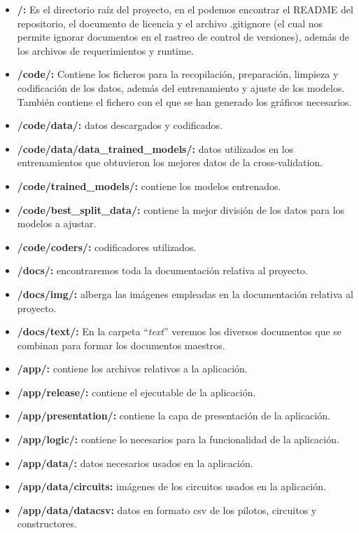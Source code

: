 \begin{itemize}
    \item \textbf{/:} Es el directorio raíz del proyecto, en el podemos encontrar el README del repositorio, el documento de licencia y el archivo .gitignore (el cual nos permite ignorar documentos en el rastreo de control de versiones), además de los archivos de requerimientos y runtime.
    \item \textbf{/code/:} Contiene los ficheros para la recopilación, preparación, limpieza y codificación de los datos, además del entrenamiento  y ajuste de los modelos. También contiene el fichero con el que se han generado los gráficos necesarios.
    \item \textbf{/code/data/:} datos descargados y codificados.
    \item \textbf{/code/data/data\_trained\_models/:} datos utilizados en los entrenamientos que obtuvieron los mejores datos de la cross-validation.
    \item \textbf{/code/trained\_models/:} contiene los modelos entrenados.
    \item \textbf{/code/best\_split\_data/:} contiene la mejor división de los datos para los modelos a ajustar.
    \item \textbf{/code/coders/:} codificadores utilizados.
    \item \textbf{/docs/:} encontraremos toda la documentación relativa al proyecto.
    \item \textbf{/docs/img/:} alberga las imágenes empleadas en la documentación relativa al proyecto.
    \item \textbf{/docs/text/:} En la carpeta ``\textit{text}'' veremos los diversos documentos que se combinan para formar los documentos maestros.
    \item \textbf{/app/:} contiene los archivos relativos a la aplicación.
    \item \textbf{/app/release/:} contiene el ejecutable de la aplicación.
    \item \textbf{/app/presentation/:} contiene la capa de presentación de la aplicación.
    \item \textbf{/app/logic/:} contiene lo necesarios para la funcionalidad de la aplicación.
    \item \textbf{/app/data/:} datos necesarios usados en la aplicación.
    \item \textbf{/app/data/circuits:} imágenes de los circuitos usados en la aplicación.
    \item \textbf{/app/data/datacsv:} datos en formato csv de los pilotos, circuitos y constructores.

\end{itemize}
